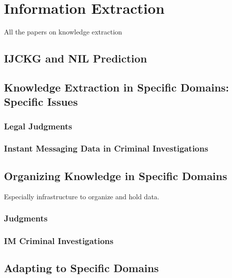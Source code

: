 \chapter{Information Extraction}
All the papers on knowledge extraction
\section{IJCKG and NIL Prediction}
\section{Knowledge Extraction in Specific Domains: Specific Issues}
\subsection{Legal Judgments}
\subsection{Instant Messaging Data in Criminal Investigations}
\section{Organizing Knowledge in Specific Domains}
Especially infrastructure to organize and hold data.
\subsection{Judgments}
\subsection{IM Criminal Investigations}
\section{Adapting to Specific Domains}
